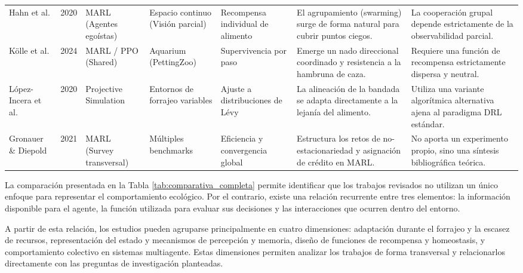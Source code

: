 \documentclass[conference]{IEEEtran}
\begin{document}
\begin{table}[tbp]
\begin{tabular}{p{1.6cm} c p{2.0cm} p{2.0cm} p{2.2cm} p{3.5cm} p{3.4cm}}
\addlinespace

Hahn et al. \cite{Paper18} &
2020 &
MARL (Agentes egoístas) &
Espacio continuo (Visión parcial) &
Recompensa individual de alimento &
El agrupamiento (swarming) surge de forma natural para cubrir puntos ciegos. &
La cooperación grupal depende estrictamente de la observabilidad parcial. \\

\addlinespace

Kölle et al. \cite{Paper19} &
2024 &
MARL / PPO (Shared) &
Aquarium (PettingZoo) &
Supervivencia por paso &
Emerge un nado direccional coordinado y resistencia a la hambruna de caza. &
Requiere una función de recompensa estrictamente dispersa y neutral. \\

\addlinespace

López-Incera et al. \cite{Paper20} &
2020 &
Projective Simulation &
Entornos de forrajeo variables &
Ajuste a distribuciones de Lévy &
La alineación de la bandada se adapta directamente a la lejanía del alimento. &
Utiliza una variante algorítmica alternativa ajena al paradigma DRL estándar. \\


\addlinespace

Gronauer \& Diepold \cite{Survey3} &
2021 &
MARL (Survey transversal) &
Múltiples benchmarks &
Eficiencia y convergencia global &
Estructura los retos de no-estacionariedad y asignación de crédito en MARL. &
No aporta un experimento propio, sino una síntesis bibliográfica teórica. \\

\bottomrule
\end{tabular}
\end{table}

La comparación presentada en la Tabla \ref{tab:comparativa_completa} permite
identificar que los trabajos revisados no utilizan un único enfoque para
representar el comportamiento ecológico. Por el contrario, existe una
relación recurrente entre tres elementos: la información disponible para
el agente, la función utilizada para evaluar sus decisiones y las
interacciones que ocurren dentro del entorno.

A partir de esta relación, los estudios pueden agruparse principalmente
en cuatro dimensiones: adaptación durante el forrajeo y la escasez de
recursos, representación del estado y mecanismos de percepción y memoria,
diseño de funciones de recompensa y homeostasis, y comportamiento
colectivo en sistemas multiagente. Estas dimensiones permiten analizar los
trabajos de forma transversal y relacionarlos directamente con las
preguntas de investigación planteadas.
\end{document}
